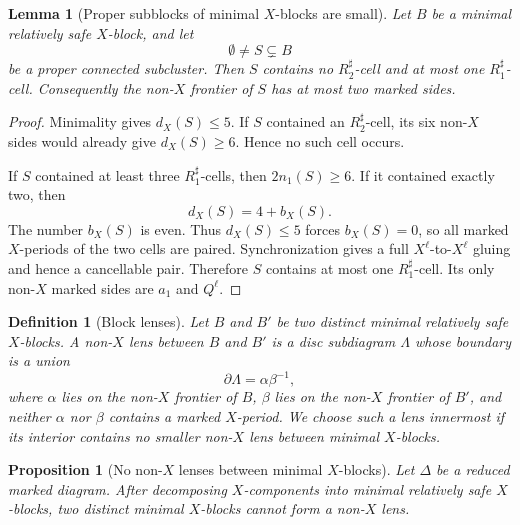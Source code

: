 \documentclass{article}
\newtheorem{lm}[theorem]{Lemma}
\newtheorem{prop}[theorem]{Proposition}
\newtheorem{df}[theorem]{Definition}
\begin{document}
\begin{lm}[Proper subblocks of minimal $X$-blocks are small]
Let $B$ be a minimal relatively safe $X$-block, and let
\[
        \emptyset\neq S\subsetneq B
\]
be a proper connected subcluster.  Then $S$ contains no
$R_2^{\sharp}$-cell and at most one $R_1^{\sharp}$-cell.  Consequently the
non-$X$ frontier of $S$ has at most two marked sides.
\end{lm}

\begin{proof}
Minimality gives $d_X(S)\leq5$.  If $S$ contained an
$R_2^{\sharp}$-cell, its six non-$X$ sides would already give
$d_X(S)\geq6$.  Hence no such cell occurs.

If $S$ contained at least three $R_1^{\sharp}$-cells, then
$2n_1(S)\geq6$.  If it contained exactly two, then
\[
        d_X(S)=4+b_X(S).
\]
The number $b_X(S)$ is even.  Thus $d_X(S)\leq5$ forces $b_X(S)=0$, so all
marked $X$-periods of the two cells are paired.  Synchronization gives a full
$X^{\ell}$-to-$X^{\ell}$ gluing and hence a cancellable pair.  Therefore $S$
contains at most one $R_1^{\sharp}$-cell.  Its only non-$X$ marked sides are
$a_1$ and $Q^{\ell}$.
\end{proof}

\begin{df}[Block lenses]
Let $B$ and $B'$ be two distinct minimal relatively safe $X$-blocks.  A
non-$X$ lens between $B$ and $B'$ is a disc subdiagram $\Lambda$ whose
boundary is a union
\[
        \partial\Lambda=\alpha\beta^{-1},
\]
where $\alpha$ lies on the non-$X$ frontier of $B$, $\beta$ lies on the
non-$X$ frontier of $B'$, and neither $\alpha$ nor $\beta$ contains a marked
$X$-period.  We choose such a lens innermost if its interior contains no
smaller non-$X$ lens between minimal $X$-blocks.
\end{df}

\begin{prop}[No non-$X$ lenses between minimal $X$-blocks]
Let $\Delta$ be a reduced marked diagram.  After decomposing
$X$-components into minimal relatively safe $X$-blocks, two distinct minimal
$X$-blocks cannot form a non-$X$ lens.
\end{prop}
\end{document}
